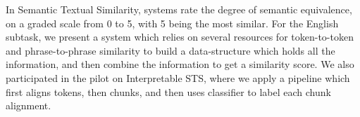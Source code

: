 In Semantic Textual Similarity, systems rate the degree of semantic equivalence, on a graded scale from 0 to 5, with 5 being the most similar. For the English subtask, we present a system which relies on several resources for token-to-token and phrase-to-phrase similarity to build a data-structure which holds all the information, and then combine the information to get a similarity score. We also participated in the pilot on Interpretable STS, where we apply a pipeline which first aligns tokens, then chunks, and then uses classifier to label each chunk alignment.
